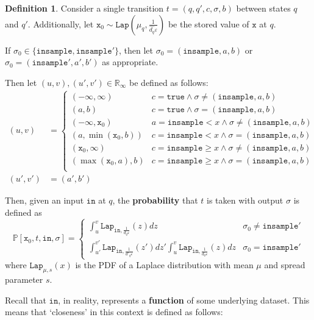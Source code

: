 \documentclass[12pt]{article}
\newcommand{\RR}{\mathbb{R}}
\newcommand{\PP}{\mathbb{P}}
\newcommand{\gguard}[1][x]{\texttt{insample}\geq #1}
\newcommand{\lguard}[1][x]{\texttt{insample} < #1}
\newcommand{\Lap}{\texttt{Lap}}
\theoremstyle{definition}
\newtheorem{defn}[thm]{Definition}
\begin{document}
\begin{defn}
    Consider a single transition $t=(q, q', c, \sigma, b)$ between states $q$ and $q'$. Additionally, let $\texttt{x}_0\sim \Lap(\mu_q, \frac{1}{\hat{d_q}\varepsilon})$ be the stored value of $\texttt{x}$ at $q$. 

    If $\sigma_0 \in \{\texttt{insample}, \texttt{insample}'\}$, then let $\sigma_0 = (\texttt{insample}, a, b)$ or $\sigma_0 = (\texttt{insample}', a', b')$ as appropriate. 
    
    Then let $(u, v), (u', v')\in \RR_{\infty}$ be defined as follows:
    \begin{align*}
        (u, v) &= \begin{cases}
        (-\infty, \infty) & c=\texttt{true}\land \sigma \neq (\texttt{insample}, a, b)\\
        (a, b) &c=\texttt{true}\land \sigma = (\texttt{insample}, a, b)\\
        (-\infty, \texttt{x}_0) & a=\lguard\land \sigma \neq (\texttt{insample}, a, b)\\
        (a, \min(\texttt{x}_0, b)) &c=\lguard\land \sigma = (\texttt{insample}, a, b)\\
        (\texttt{x}_0, \infty) & c=\gguard\land \sigma \neq (\texttt{insample}, a, b)\\
        (\max(\texttt{x}_0, a),b) &c=\gguard\land \sigma = (\texttt{insample}, a, b)\\
    \end{cases}\\
    (u', v')& = (a', b')\end{align*}

    Then, given an input $\texttt{in}$ at $q$, the \textbf{probability} that $t$ is taken with output $\sigma$ is defined as \[
        \PP[\texttt{x}_0, t, \texttt{in}, \sigma] = \begin{cases}
            \int_u^v \Lap_{\texttt{in}, \frac{1}{d_q\varepsilon}}(z)dz & \sigma_0 \neq \texttt{insample}' \\
            \int_{u'}^{v'}\Lap_{\texttt{in}, \frac{1}{d'_q\varepsilon}}(z')dz'\int_u^v \Lap_{\texttt{in}, \frac{1}{d_q\varepsilon}}(z)dz& \sigma_0 = \texttt{insample}'
        \end{cases}
    \]
    where $\Lap_{\mu, s}(x)$ is the PDF of a Laplace distribution with mean $\mu$ and spread parameter $s$.
\end{defn}


Recall that $\texttt{in}$, in reality, represents a \textbf{function} of some underlying dataset. This means that `closeness' in this context is defined as follows:
\end{document}
